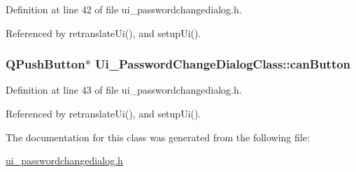 Definition at line 42 of file ui\_\-passwordchangedialog.h.

Referenced by retranslateUi(), and setupUi().\hypertarget{class_ui___password_change_dialog_class_f84b71a78950336e1c5dad8189c6f9d4}{
\subsubsection[canButton]{\setlength{\rightskip}{0pt plus 5cm}QPushButton$\ast$ {\bf Ui\_\-PasswordChangeDialogClass::canButton}}}
\label{class_ui___password_change_dialog_class_f84b71a78950336e1c5dad8189c6f9d4}




Definition at line 43 of file ui\_\-passwordchangedialog.h.

Referenced by retranslateUi(), and setupUi().

The documentation for this class was generated from the following file:\begin{CompactItemize}
\item 
\hyperlink{ui__passwordchangedialog_8h}{ui\_\-passwordchangedialog.h}\end{CompactItemize}
